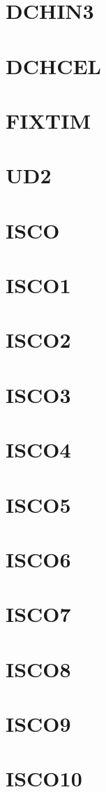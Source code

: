 \documentclass[10pt,UTF8]{ctexbook}
\begin{document}
\section{DCHIN3}
\section{DCHCEL}
\section{FIXTIM}
\section{UD2}
\section{ISCO}
\section{ISCO1}
\section{ISCO2}
\section{ISCO3}
\section{ISCO4}
\section{ISCO5}
\section{ISCO6}
\section{ISCO7}
\section{ISCO8}
\section{ISCO9}
\section{ISCO10}
\end{document}
